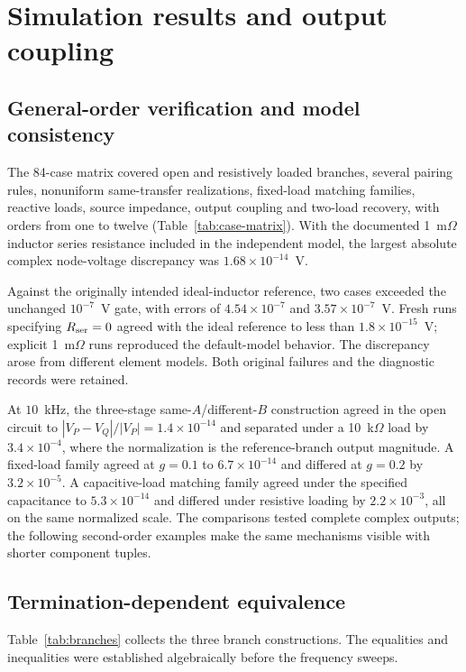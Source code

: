 \section{Simulation results and output coupling}

\subsection{General-order verification and model consistency}

The 84-case matrix covered open and resistively loaded branches, several pairing rules, nonuniform same-transfer realizations, fixed-load matching families, reactive loads, source impedance, output coupling and two-load recovery, with orders from one to twelve (Table~\ref{tab:case-matrix}). With the documented 1~m$\Omega$ inductor series resistance included in the independent model, the largest absolute complex node-voltage discrepancy was $1.68\times10^{-14}$~V.

Against the originally intended ideal-inductor reference, two cases exceeded the unchanged $10^{-7}$~V gate, with errors of $4.54\times10^{-7}$ and $3.57\times10^{-7}$~V. Fresh runs specifying $R_{\rm ser}=0$ agreed with the ideal reference to less than $1.8\times10^{-15}$~V; explicit 1~m$\Omega$ runs reproduced the default-model behavior. The discrepancy arose from different element models. Both original failures and the diagnostic records were retained.

At $10$~kHz, the three-stage same-$A$/different-$B$ construction agreed in the open circuit to $|V_P-V_Q|/|V_P|=1.4\times10^{-14}$ and separated under a 10~k$\Omega$ load by $3.4\times10^{-4}$, where the normalization is the reference-branch output magnitude. A fixed-load family agreed at $g=0.1$ to $6.7\times10^{-14}$ and differed at $g=0.2$ by $3.2\times10^{-5}$. A capacitive-load matching family agreed under the specified capacitance to $5.3\times10^{-14}$ and differed under resistive loading by $2.2\times10^{-3}$, all on the same normalized scale. The comparisons tested complete complex outputs; the following second-order examples make the same mechanisms visible with shorter component tuples.

\subsection{Termination-dependent equivalence}

Table~\ref{tab:branches} collects the three branch constructions. The equalities and inequalities were established algebraically before the frequency sweeps.

